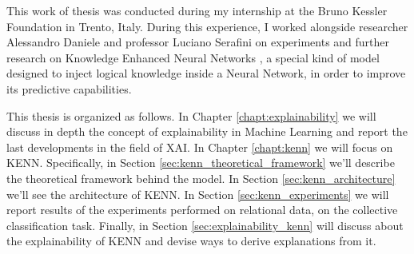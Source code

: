 This work of thesis was conducted during my internship at the Bruno Kessler Foundation in Trento, Italy. During this experience, I worked alongside researcher Alessandro Daniele and professor Luciano Serafini on experiments and further research on Knowledge Enhanced Neural Networks \cite{daniele2019kenn}, a special kind of model designed to inject logical knowledge inside a Neural Network, in order to improve its predictive capabilities.

This thesis is organized as follows. In Chapter \ref{chapt:explainability} we will discuss in depth the concept of explainability in Machine Learning and report the last developments in the field of XAI. In Chapter \ref{chapt:kenn} we will focus on KENN. Specifically, in Section \ref{sec:kenn_theoretical_framework} we'll describe the theoretical framework behind the model. In Section \ref{sec:kenn_architecture} we'll see the architecture of KENN. In Section \ref{sec:kenn_experiments} we will report results of the experiments performed on relational data, on the collective classification task. Finally, in Section \ref{sec:explainability_kenn} will discuss about the explainability of KENN and devise ways to derive explanations from it.

